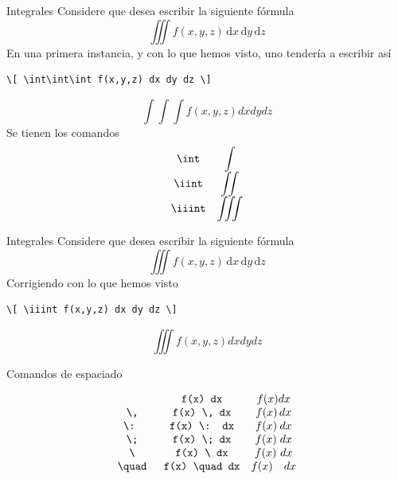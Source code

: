 \documentclass[../slides.tex]{subfiles}
\begin{document}
    \begin{frame}[fragile]{Integrales}
        Considere que desea escribir la siguiente fórmula
            \[ \iiint f(x,y,z) \, \mathrm{d}x \, \mathrm{d}y \, \mathrm{d}z \]
        \pause
        En una primera instancia, y con lo que hemos visto, uno tendería a escribir así
            \begin{verbatim}
\[ \int\int\int f(x,y,z) dx dy dz \]
            \end{verbatim}
        \pause
\[ \int\int\int f(x,y,z) dx dy dz \]
        \pause
        Se tienen los comandos
        \[\begin{array}{cc}
            \text{\texttt{\textbackslash int}} & \displaystyle \int \\
            \text{\texttt{\textbackslash iint}} & \displaystyle\iint \\
            \text{\texttt{\textbackslash iiint}} & \displaystyle\iiint
        \end{array}\]
    \end{frame} 
    
    \begin{frame}[fragile]{Integrales}
        Considere que desea escribir la siguiente fórmula
            \[ \iiint f(x,y,z) \, \mathrm{d}x \, \mathrm{d}y \, \mathrm{d}z \]
        Corrigiendo con lo que hemos visto
            \begin{verbatim}
\[ \iiint f(x,y,z) dx dy dz \]
            \end{verbatim}
        \pause
\[ \iiint f(x,y,z) dx dy dz \]
    \end{frame}
    
    \begin{frame}[fragile]{Comandos de espaciado}{}
    
        {\Large\[
        	\begin{array}{ccc}
                \text{} & \text{\texttt{f(x) dx}} & f(x) dx\\
                \text{\texttt{\textbackslash, }} & \text{\texttt{f(x) \textbackslash, dx}} & f(x) \, dx\\
                \text{\texttt{\textbackslash: }} & \text{\texttt{f(x) \textbackslash: dx}} & f(x) \: dx\\
                \text{\texttt{\textbackslash; }} & \text{\texttt{f(x) \textbackslash; dx}} & f(x) \; dx\\
                \text{\texttt{\textbackslash{}  }} & \text{\texttt{f(x) \textbackslash{}  dx}} & f(x) \ dx\\
                \text{\texttt{\textbackslash{}quad }} & \text{\texttt{f(x) \textbackslash quad dx}} & f(x) \quad dx
        	\end{array}
        \]}

    \end{frame} 
    
\end{document}
